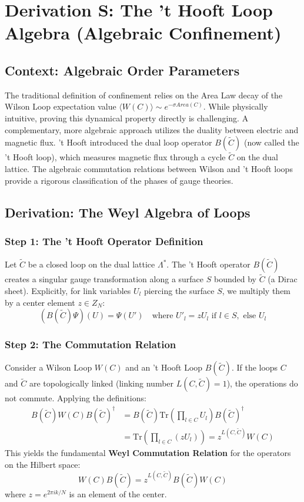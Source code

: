 \chapter{Derivation S: The 't Hooft Loop Algebra (Algebraic Confinement)}
\label{ch:derivation_s_thooft_algebra}

\section{Context: Algebraic Order Parameters}
The traditional definition of confinement relies on the Area Law decay of the Wilson Loop expectation value $\langle W(C) \rangle \sim e^{-\sigma Area(C)}$. While physically intuitive, proving this dynamical property directly is challenging. A complementary, more algebraic approach utilizes the duality between electric and magnetic flux.
't Hooft introduced the dual loop operator $B(\tilde{C})$ (now called the 't Hooft loop), which measures magnetic flux through a cycle $\tilde{C}$ on the dual lattice. The algebraic commutation relations between Wilson and 't Hooft loops provide a rigorous classification of the phases of gauge theories.

\section{Derivation: The Weyl Algebra of Loops}

\subsection{Step 1: The 't Hooft Operator Definition}
Let $\tilde{C}$ be a closed loop on the dual lattice $\Lambda^*$. The 't Hooft operator $B(\tilde{C})$ creates a singular gauge transformation along a surface $S$ bounded by $\tilde{C}$ (a Dirac sheet). Explicitly, for link variables $U_l$ piercing the surface $S$, we multiply them by a center element $z \in Z_N$:
\begin{equation}
(B(\tilde{C}) \Psi)(U) = \Psi(U') \quad \text{where } U'_l = z U_l \text{ if } l \in S, \text{ else } U_l
\end{equation}

\subsection{Step 2: The Commutation Relation}
Consider a Wilson Loop $W(C)$ and an 't Hooft Loop $B(\tilde{C})$. If the loops $C$ and $\tilde{C}$ are topologically linked (linking number $L(C, \tilde{C}) = 1$), the operations do not commute.
Applying the definitions:
\begin{align}
B(\tilde{C}) W(C) B(\tilde{C})^\dagger &= B(\tilde{C}) \text{Tr}\left(\prod_{l \in C} U_l\right) B(\tilde{C})^\dagger \\
&= \text{Tr}\left(\prod_{l \in C} (z U_l)\right) = z^{L(C, \tilde{C})} W(C)
\end{align}
This yields the fundamental \textbf{Weyl Commutation Relation} for the operators on the Hilbert space:
\begin{equation}
W(C) B(\tilde{C}) = z^{L(C, \tilde{C})} B(\tilde{C}) W(C)
\end{equation}
where $z = e^{2\pi i k / N}$ is an element of the center.

